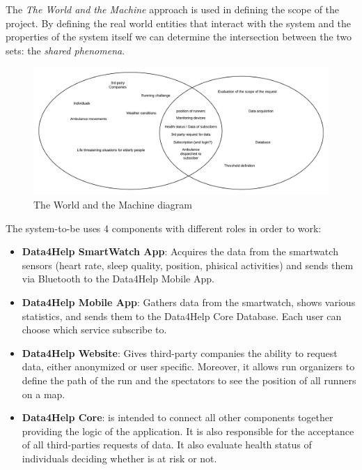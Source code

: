

The \textit{The World and the Machine} approach is used in defining the scope of the project.
By defining the real world entities that interact with the system and the properties of the system itself we can determine the intersection between the two sets: the \textit{shared phenomena}.

\begin{figure}[H]
	\includegraphics[width=\textwidth,height=\textheight,keepaspectratio]{assets/twatm.pdf}
	\caption{The World and the Machine diagram}
	\label{fig:TWATM}
\end{figure}

The system-to-be uses 4 components with different roles in order to work:
\begin{itemize}
    \item \textbf{Data4Help SmartWatch App}: Acquires the data from the smartwatch sensors (heart rate, sleep quality, position, phisical activities) and sends them via Bluetooth to the Data4Help Mobile App.
    \item \textbf{Data4Help Mobile App}: Gathers data from the smartwatch, shows various statistics, and sends them to the Data4Help Core Database. Each user can choose which service subscribe to.
    \item \textbf{Data4Help Website}: Gives third-party companies the ability to request data, either anonymized or user specific. Moreover, it allows run organizers to define the path of the run and the spectators to see the position of all runners on a map.
    \item \textbf{Data4Help Core}: is intended to connect all other components together providing the logic of the application. It is also responsible for the acceptance of all third-parties requests of data. It also evaluate health status of individuals deciding whether is at risk or not.
\end{itemize}

